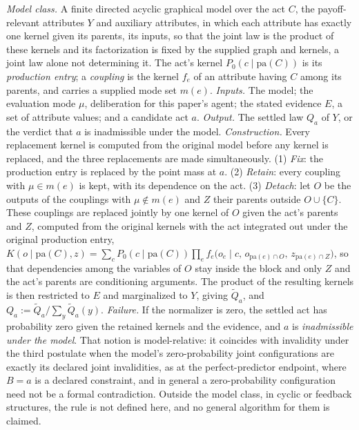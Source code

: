 \begin{definition}\label{def:settle}
\emph{Model class.} A finite directed acyclic graphical model over the act $C$, the payoff-relevant attributes $Y$ and auxiliary attributes, in which each attribute has exactly one kernel given its parents, its inputs, so that the joint law is the product of these kernels and its factorization is fixed by the supplied graph and kernels, a joint law alone not determining it. The act's kernel $P_0(c \mid \mathrm{pa}(C))$ is its \emph{production entry}; a \emph{coupling} is the kernel $f_e$ of an attribute having $C$ among its parents, and carries a supplied mode set $m(e)$.
\emph{Inputs.} The model; the evaluation mode $\mu$, deliberation for this paper's agent; the stated evidence $E$, a set of attribute values; and a candidate act $a$.
\emph{Output.} The settled law $Q_a$ of $Y$, or the verdict that $a$ is inadmissible under the model.
\emph{Construction.} Every replacement kernel is computed from the original model before any kernel is replaced, and the three replacements are made simultaneously. (1) \emph{Fix}: the production entry is replaced by the point mass at $a$. (2) \emph{Retain}: every coupling with $\mu \in m(e)$ is kept, with its dependence on the act. (3) \emph{Detach}: let $O$ be the outputs of the couplings with $\mu \notin m(e)$ and $Z$ their parents outside $O \cup \{C\}$. These couplings are replaced jointly by one kernel of $O$ given the act's parents and $Z$, computed from the original kernels with the act integrated out under the original production entry, $K(o \mid \mathrm{pa}(C), z) = \sum_c P_0(c \mid \mathrm{pa}(C)) \prod_{e} f_e\bigl(o_e \mid c,\, o_{\mathrm{pa}(e) \cap O},\, z_{\mathrm{pa}(e) \cap Z}\bigr)$, so that dependencies among the variables of $O$ stay inside the block and only $Z$ and the act's parents are conditioning arguments. The product of the resulting kernels is then restricted to $E$ and marginalized to $Y$, giving $\widetilde Q_a$, and $Q_a := \widetilde Q_a / \sum_y \widetilde Q_a(y)$.
\emph{Failure.} If the normalizer is zero, the settled act has probability zero given the retained kernels and the evidence, and $a$ is \emph{inadmissible under the model}. That notion is model-relative: it coincides with invalidity under the third postulate when the model's zero-probability joint configurations are exactly its declared joint invalidities, as at the perfect-predictor endpoint, where $B = a$ is a declared constraint, and in general a zero-probability configuration need not be a formal contradiction. Outside the model class, in cyclic or feedback structures, the rule is not defined here, and no general algorithm for them is claimed.
\end{definition}

